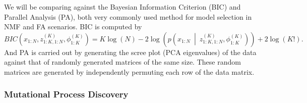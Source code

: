 We will be comparing \methodname against the Bayesian Information Criterion (BIC) and Parallel Analysis (PA), both very commonly used method for model selection in NMF and FA scenarios. BIC is computed by
\[
BIC\left(x_{1:N},z^{(K)}_{1:K,1:N},\phi^{(K)}_{1:K}\right) = K\log(N) - 2\log\left(p\left(x_{1:N}~\middle|~ z^{(K)}_{1:K,1:N},\phi^{(K)}_{1:K}\right)\right)+2\log(K!).
\]
And PA is carried out by generating the scree plot (PCA eigenvalues) of the data against that of randomly generated matrices of the same size. These random matrices are generated by independently permuting each row of the data matrix.

\subsubsection{Mutational Process Discovery} \label{sec:mutsigs}

